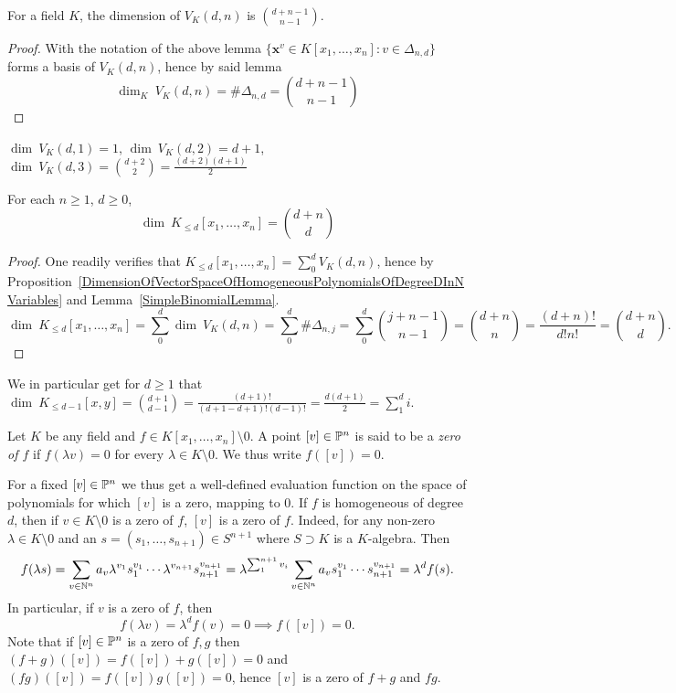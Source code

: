 \begin{proposition}\label{DimensionOfVectorSpaceOfHomogeneousPolynomialsOfDegreeDInNVariables}
    For a field $K$, the dimension of $V_K(d,n)$ is ${d+n-1 \choose n-1}$.
\end{proposition}
\begin{proof}
    With the notation of the above lemma $\{ \mathbf{x}^v \in K[x_1,\dots,x_n] : v\in \Delta_{n,d}\}$ forms a basis of $V_K(d,n)$, hence by said lemma
    $$\dim_K \ V_K(d,n) = \#\Delta_{n,d}= {d+n-1 \choose n-1}$$
\end{proof}
\begin{example}
    $\dim\ V_K(d,1)=1$, $\dim\ V_K(d,2)=d+1$, $\dim\ V_K(d,3) = {d+2\choose 2} = \frac{(d+2)(d+1)}{2}$
\end{example}
\begin{proposition}\label{DimensionOfVectorSpaceOfPolynomialsInNVariablesOfAtMostDegreeD}
    For each $n\geq 1$, $d\geq 0$, 
    $$\dim\ K_{\leq d}[x_1,\dots,x_n] = {d+n\choose d}$$
\end{proposition}
\begin{proof}
    One readily verifies that $K_{\leq d}[x_1,\dots,x_n] = \sum_0^d V_K(d,n)$, hence by Proposition~\ref{DimensionOfVectorSpaceOfHomogeneousPolynomialsOfDegreeDInNVariables} and Lemma~\ref{SimpleBinomialLemma}.
    $$\dim\ K_{\leq d}[x_1,\dots,x_n]=\sum_0^d \dim\ V_K(d,n)=\sum_0^d \#\Delta_{n,j} = \sum_0^d {j+n-1 \choose n-1}={d+n\choose n} = \frac{(d+n)!}{d!n!}={d+n\choose d}.$$
\end{proof}
\begin{example}\label{ImportantExamplePolynomialVectorSpaceDimension}
    We in particular get for $d\geq 1$ that $\dim\ K_{\leq d-1}[x,y] = {d+1\choose d-1} = \frac{(d+1)!}{(d+1-d+1)!(d-1)!}=\frac{d(d+1)}{2}=\sum_1^di.$
\end{example}
\begin{definition}
    Let $K$ be any field and $f\in K[x_1,\dots,x_n]\setminus0 $. A point $[v]\in \mathbb{P}^n$ is said to be a \textit{zero of $f$} if $f(\lambda v)=0$ for every $\lambda\in K\setminus 0$. We thus write $f([v])=0$.
\end{definition}
\begin{remark}
    For a fixed $[v]\in\mathbb{P}^n$ we thus get a well-defined evaluation function on the space of polynomials for which $[v]$ is a zero, mapping to $0$. If $f$ is homogeneous of degree $d$, then if $v\in K\setminus 0$ is a zero of $f$, $[v]$ is a zero of $f$. Indeed, for any non-zero $\lambda\in K\setminus 0$ and an $s=(s_1,\dots,s_{n+1})\in S^{n+1}$ where $S\supset K$ is a $K$-algebra. Then 
    $$f(\lambda s)=\sum_{v\in\mathbb{N}^n} a_v\lambda^{v_1}s_1^{v_1}\cdots \lambda^{v_{n+1}}s_{n+1}^{v_{n+1}}= \lambda^{\sum_1^{n+1} v_i}\sum_{v\in\mathbb{N}^n} a_v s_1^{v_1}\cdots s_{n+1}^{v_{n+1}}=\lambda^df(s).$$
    In particular, if $v$ is a zero of $f$, then 
    $$f(\lambda v)=\lambda^df(v)=0\implies f([v])=0.$$
    Note that if $[v]\in\mathbb{P}^n$ is a zero of $f,g$ then $(f+g)([v])=f([v])+g([v])=0$ and $(fg)([v])=f([v])g([v])=0$, hence $[v]$ is a zero of $f+g$ and $fg$.
\end{remark}
